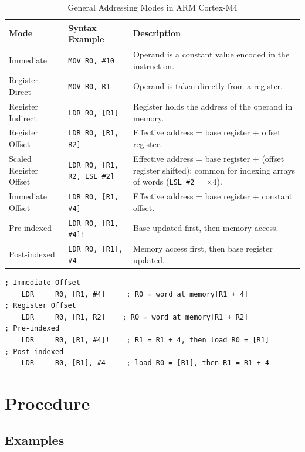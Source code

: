 \begin{table}[H]
\centering
\caption{General Addressing Modes in ARM Cortex-M4}
\small
\begin{tabularx}{\linewidth}{@{}l l X@{}}
\toprule
\textbf{Mode} & \textbf{Syntax Example} & \textbf{Description} \\
\midrule
Immediate      & \texttt{MOV R0, \#10}          & Operand is a constant value encoded in the instruction. \\
Register Direct& \texttt{MOV R0, R1}            & Operand is taken directly from a register. \\
Register Indirect & \texttt{LDR R0, [R1]}       & Register holds the address of the operand in memory. \\
Register Offset & \texttt{LDR R0, [R1, R2]}     & Effective address = base register + offset register. \\
Scaled Register Offset & \texttt{LDR R0, [R1, R2, LSL \#2]} & Effective address = base register + (offset register shifted); common for indexing arrays of words (\texttt{LSL \#2} = $\times 4$). \\
Immediate Offset & \texttt{LDR R0, [R1, \#4]}   & Effective address = base register + constant offset. \\
Pre-indexed    & \texttt{LDR R0, [R1, \#4]!}    & Base updated first, then memory access. \\
Post-indexed   & \texttt{LDR R0, [R1], \#4}     & Memory access first, then base register updated. \\
\bottomrule
\end{tabularx}
\vspace{2pt}
\end{table}
\begin{lstlisting}[caption={Examples of Offset, Pre-indexed, and Post-indexed Addressing Modes}]
; Immediate Offset
    LDR     R0, [R1, #4]     ; R0 = word at memory[R1 + 4]
; Register Offset
    LDR     R0, [R1, R2]    ; R0 = word at memory[R1 + R2]
; Pre-indexed
    LDR     R0, [R1, #4]!    ; R1 = R1 + 4, then load R0 = [R1]
; Post-indexed
    LDR     R0, [R1], #4     ; load R0 = [R1], then R1 = R1 + 4
\end{lstlisting}

\newpage
\section{Procedure}

\subsection{Examples}

